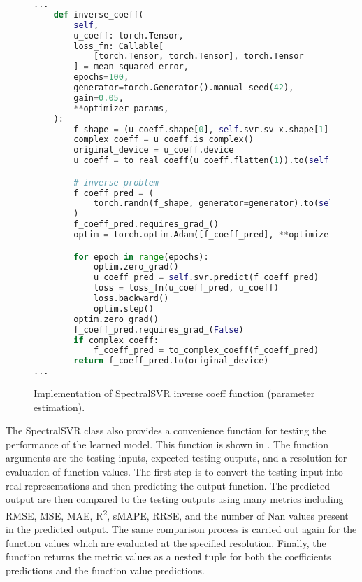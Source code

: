 \begin{figure}[H]
  \centering
  \begin{lstlisting}[language=Python]
...
    def inverse_coeff(
        self,
        u_coeff: torch.Tensor,
        loss_fn: Callable[
            [torch.Tensor, torch.Tensor], torch.Tensor
        ] = mean_squared_error,
        epochs=100,
        generator=torch.Generator().manual_seed(42),
        gain=0.05,
        **optimizer_params,
    ):
        f_shape = (u_coeff.shape[0], self.svr.sv_x.shape[1])
        complex_coeff = u_coeff.is_complex()
        original_device = u_coeff.device
        u_coeff = to_real_coeff(u_coeff.flatten(1)).to(self.svr.device)

        # inverse problem
        f_coeff_pred = (
            torch.randn(f_shape, generator=generator).to(self.svr.device) * gain
        )
        f_coeff_pred.requires_grad_()
        optim = torch.optim.Adam([f_coeff_pred], **optimizer_params)

        for epoch in range(epochs):
            optim.zero_grad()
            u_coeff_pred = self.svr.predict(f_coeff_pred)
            loss = loss_fn(u_coeff_pred, u_coeff)
            loss.backward()
            optim.step()
        optim.zero_grad()
        f_coeff_pred.requires_grad_(False)
        if complex_coeff:
            f_coeff_pred = to_complex_coeff(f_coeff_pred)
        return f_coeff_pred.to(original_device)
...
  \end{lstlisting}
  \caption{Implementation of SpectralSVR inverse coeff function (parameter estimation).}\label{fig:spectralsvr_inverse_impl}
\end{figure}

The SpectralSVR class also provides a convenience function for testing the performance of the learned model. This function is shown in . The function arguments are the testing inputs, expected testing outputs, and a resolution for evaluation of function values. The first step is to convert the testing input into real representations and then predicting the output function. The predicted output are then compared to the testing outputs using many metrics including RMSE, MSE, MAE, R\textsuperscript{2}, sMAPE, RRSE, and the number of Nan values present in the predicted output. The same comparison process is carried out again for the function values which are evaluated at the specified resolution. Finally, the function returns the metric values as a nested tuple for both the coefficients predictions and the function value predictions.


